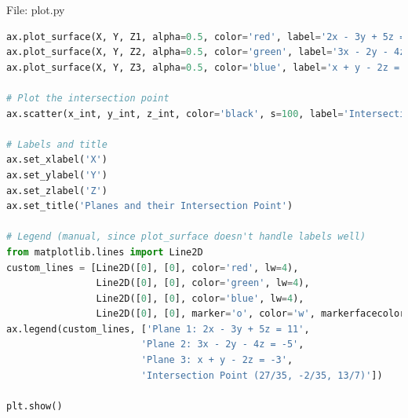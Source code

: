 \documentclass{beamer}
\numberwithin{equation}{section}
\theoremstyle{remark}
\begin{document}
\begin{frame}[fragile]{File: plot.py}
\begin{lstlisting}[language=Python]
ax.plot_surface(X, Y, Z1, alpha=0.5, color='red', label='2x - 3y + 5z = 11')
ax.plot_surface(X, Y, Z2, alpha=0.5, color='green', label='3x - 2y - 4z = -5')
ax.plot_surface(X, Y, Z3, alpha=0.5, color='blue', label='x + y - 2z = -3')

# Plot the intersection point
ax.scatter(x_int, y_int, z_int, color='black', s=100, label='Intersection Point')

# Labels and title
ax.set_xlabel('X')
ax.set_ylabel('Y')
ax.set_zlabel('Z')
ax.set_title('Planes and their Intersection Point')

# Legend (manual, since plot_surface doesn't handle labels well)
from matplotlib.lines import Line2D
custom_lines = [Line2D([0], [0], color='red', lw=4),
                Line2D([0], [0], color='green', lw=4),
                Line2D([0], [0], color='blue', lw=4),
                Line2D([0], [0], marker='o', color='w', markerfacecolor='black', markersize=10)]
ax.legend(custom_lines, ['Plane 1: 2x - 3y + 5z = 11', 
                        'Plane 2: 3x - 2y - 4z = -5', 
                        'Plane 3: x + y - 2z = -3', 
                        'Intersection Point (27/35, -2/35, 13/7)'])

plt.show()

\end{lstlisting}
\end{frame}
\end{document}
